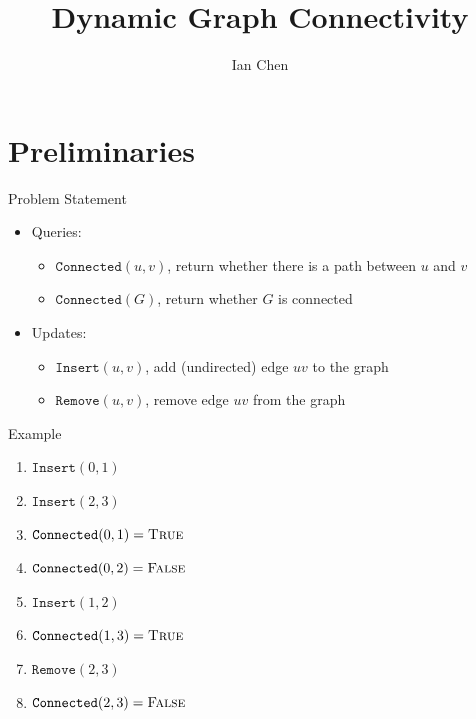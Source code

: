 \documentclass[aspectratio=169, handout]{beamer}
\title{Dynamic Graph Connectivity}
\author{Ian Chen}
\date{}
\institute{University of Illinois Urbana-Champaign}
\newcommand{\connected}{\texttt{Connected}}
\newcommand{\insertE}{\texttt{Insert}}
\newcommand{\removeE}{\texttt{Remove}}
\newcommand{\TrueB}{\textsc{True}}
\newcommand{\FalseB}{\textsc{False}}
\begin{document}
\begin{frame}
    \titlepage
\end{frame}

\frame{\tableofcontents}

\section{Preliminaries}
\frame{\tableofcontents[currentsection]}

\begin{frame}{Problem Statement}
    \begin{itemize}
        \pause
        \item Queries:
              \begin{itemize}
                  \item $\connected(u, v)$, return whether there is a path between $u$ and $v$
                  \item $\connected(G)$, return whether $G$ is connected
              \end{itemize}
              \pause
        \item Updates:
              \begin{itemize}
                  \item $\insertE(u, v)$, add (undirected) edge $uv$ to the graph
                  \item $\removeE(u, v)$, remove edge $uv$ from the graph
              \end{itemize}
    \end{itemize}
\end{frame}

\begin{frame}{Example}
    \begin{enumerate}
        \item $\insertE(0, 1)$
              \pause
        \item $\insertE(2, 3)$
              \pause
        \item $\connected(0, 1) = \TrueB$
              \pause
        \item $\connected(0, 2) = \FalseB$
              \pause
        \item $\insertE(1, 2)$
              \pause
        \item $\connected(1, 3) = \TrueB$
              \pause
        \item $\removeE(2, 3)$
              \pause
        \item $\connected(2, 3) = \FalseB$
    \end{enumerate}
\end{frame}
\end{document}
